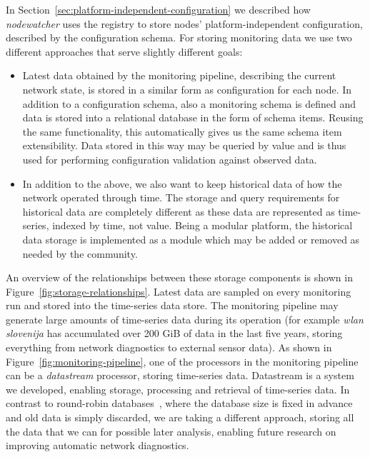 \documentclass[5p,sort&compress]{elsarticle}
\newcommand{\nodewatcher}{\textit{nodewatcher}}
\newcommand{\wlanslovenija}{\textit{wlan slovenija}}
\begin{document}
In Section~\ref{sec:platform-independent-configuration} we described how \nodewatcher{} uses the registry to store nodes' platform-independent configuration, described by the configuration schema.
For storing monitoring data we use two different approaches that serve slightly different goals:
\begin{itemize}
\item Latest data obtained by the monitoring pipeline, describing the current network state, is stored in a similar form as configuration for each node.
In addition to a configuration schema, also a monitoring schema is defined and data is stored into a relational database in the form of schema items.
Reusing the same functionality, this automatically gives us the same schema item extensibility.
Data stored in this way may be queried by value and is thus used for performing configuration validation against observed data.

\item In addition to the above, we also want to keep historical data of how the network operated through time.
The storage and query requirements for historical data are completely different as these data are represented as time-series, indexed by time, not value.
Being a modular platform, the historical data storage is implemented as a module which may be added or removed as needed by the community.
\end{itemize}

An overview of the relationships between these storage components is shown in Figure~\ref{fig:storage-relationships}.
Latest data are sampled on every monitoring run and stored into the time-series data store.
The monitoring pipeline may generate large amounts of time-series data during its operation (for example \wlanslovenija{} has accumulated over 200 GiB of data in the last five years, storing everything from network diagnostics to external sensor data).
As shown in Figure~\ref{fig:monitoring-pipeline}, one of the processors in the monitoring pipeline can be a \textit{datastream} processor, storing time-series data.
Datastream is a system we developed, enabling storage, processing and retrieval of time-series data.
In contrast to round-robin databases~\cite{Oetiker_1999}, where the database size is fixed in advance and old data is simply discarded, we are taking a different approach, storing all the data that we can for possible later analysis, enabling future research on improving automatic network diagnostics.
\end{document}
